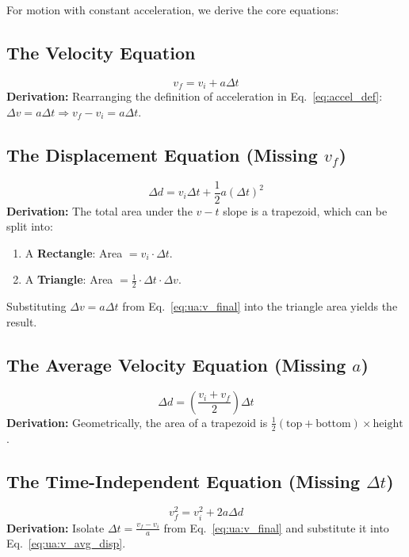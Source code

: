 \documentclass{article}
\begin{document}
For motion with constant acceleration, we derive the core equations:

\subsection{The Velocity Equation}
\begin{equation}
  v_f = v_i + a\Delta t
  \label{eq:ua:v_final}
\end{equation}
\textbf{Derivation:} Rearranging the definition of acceleration in Eq.~\eqref{eq:accel_def}: $\Delta v = a\Delta t \Rightarrow v_f - v_i = a\Delta t$.

\subsection{The Displacement Equation (Missing \texorpdfstring{$v_f$}{v\_f})}
\begin{equation}
  \Delta d = v_i \Delta t + \frac{1}{2}a(\Delta t)^2
  \label{eq:ua:disp_1}
\end{equation}
\textbf{Derivation:} The total area under the $v-t$ slope is a trapezoid, which can be split into:
\begin{enumerate}
  \item A \textbf{Rectangle}: Area $= v_i \cdot \Delta t$.
  \item A \textbf{Triangle}: Area $= \frac{1}{2} \cdot \Delta t \cdot \Delta v$.
\end{enumerate}
Substituting $\Delta v = a\Delta t$ from Eq.~\eqref{eq:ua:v_final} into the triangle area yields the result.

\subsection{The Average Velocity Equation (Missing \texorpdfstring{$a$}{a})}
\begin{equation}
  \Delta d = \left( \frac{v_i + v_f}{2} \right) \Delta t
  \label{eq:ua:v_avg_disp}
\end{equation}
\textbf{Derivation:} Geometrically, the area of a trapezoid is $\frac{1}{2}(\text{top} + \text{bottom}) \times \text{height}$.

\subsection{The Time-Independent Equation (Missing \texorpdfstring{$\Delta t$}{Delta t})}
\begin{equation}
  v_f^2 = v_i^2 + 2a\Delta d
  \label{eq:ua:time_indep}
\end{equation}
\textbf{Derivation:} Isolate $\Delta t = \frac{v_f - v_i}{a}$ from Eq.~\eqref{eq:ua:v_final} and substitute it into Eq.~\eqref{eq:ua:v_avg_disp}.
\end{document}
